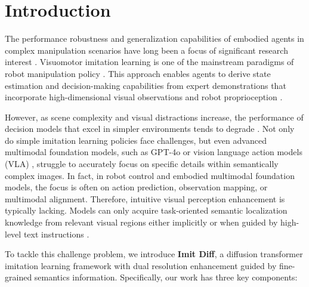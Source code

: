 \section{Introduction}


\label{Intro}
The performance robustness and generalization capabilities of embodied agents in complex manipulation scenarios have long been a focus of significant research interest \citep{ju2025robo, yuan2024learning}. Visuomotor imitation learning is one of the mainstream paradigms of robot manipulation policy \citep{chi2023diffusion, shridhar2023perceiver, ze2023gnfactor, florence2022implicit, hansen2022pre}. This approach enables agents to derive state estimation and decision-making capabilities from expert demonstrations that incorporate high-dimensional visual observations and robot proprioception \citep{ze20243d}.

However, as scene complexity and visual distractions increase, the performance of decision models that excel in simpler environments tends to degrade \citep{zheng2024instruction, liurobustness}. Not only do simple imitation learning policies face challenges, but even advanced multimodal foundation models, such as GPT-4o \citep{hurst2024gpt} or vision language action models (VLA) \citep{liu2024rdt, brohan2022rt, brohan2023rt, o2023open, kim2024openvla, wen2024diffusion}, struggle to accurately focus on specific details within semantically complex images. In fact, in robot control and embodied multimodal foundation models, the focus is often on action prediction, observation mapping, or multimodal alignment. Therefore, intuitive visual perception enhancement is typically lacking. Models can only acquire task-oriented semantic localization knowledge from relevant visual regions either implicitly or when guided by high-level text instructions \citep{reuss2023multimodal}.

To tackle this challenge problem, we introduce \textbf{Imit Diff}, a diffusion transformer imitation learning framework with dual resolution enhancement guided by fine-grained semantics information. Specifically, our work has three key components:

